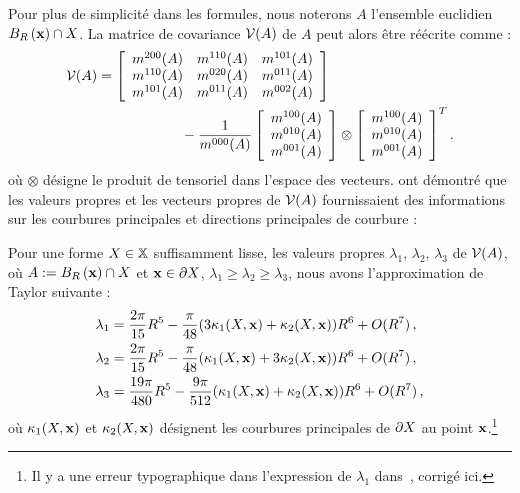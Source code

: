 Pour plus de simplicité dans les formules, nous noterons $A$ l'ensemble
euclidien $B_{R}\left(\mathbf{x}\right) \cap X$. La matrice de covariance $\mathcal{V}(A)$ de
$A$ peut alors être réécrite comme :
\begin{align}
  \mathcal{V}(A) &=  \left\lbrack
    \begin{array}{ccc}
      m^{200}(A) & m^{110}(A) & m^{101}(A)\\
      m^{110}(A) & m^{020}(A) & m^{011}(A)\\
      m^{101}(A) & m^{011}(A) & m^{002}(A)
    \end{array}
    \right\rbrack\quad\quad\quad\quad\quad\quad \nonumber \\
    &\quad\quad\quad\quad\quad\quad- \frac{1}{m^{000}(A)}
    \left\lbrack
    \begin{array}{c}
      m^{100}(A) \\
      m^{010}(A) \\
      m^{001}(A) \\
    \end{array}
    \right\rbrack
    \otimes
    \left\lbrack
    \begin{array}{c}
      m^{100}(A) \\
      m^{010}(A) \\
      m^{001}(A) \\
    \end{array}
    \right\rbrack^T.
\label{eq:defCov}
\end{align}
%
où $\otimes$ désigne le produit de tensoriel dans l'espace des vecteurs.
%
 ont démontré que les valeurs propres et les
vecteurs propres de $\mathcal{V}(A)$ fournissaient des informations sur les courbures
principales et directions principales de courbure :
%
\begin{lemma}
 \label{lem:pottmann-3d}
 Pour une forme $X \in \mathbb{X}$ suffisamment lisse, les valeurs propres $\lambda_1$,
 $\lambda_2$, $\lambda_3$ de $\mathcal{V}(A)$, où $ A := B_{R}\left(\mathbf{x}\right) \cap
 X$ et $\mathbf{x} \in \partial X$, $\lambda_1 \ge \lambda_2 \ge
 \lambda_3$, nous avons l'approximation de Taylor suivante :
 \begin{align}
   \lambda_1& = \frac{2\pi}{15}R^5 - \frac{\pi}{48}(3\kappa_{1}(X,\mathbf{x}) + \kappa_{2}(X,\mathbf{x}))R^6 + O(R^7)\,,\\
   \lambda_2& = \frac{2\pi}{15}R^5 - \frac{\pi}{48}(\kappa_{1}(X,\mathbf{x}) + 3\kappa_{2}(X,\mathbf{x}))R^6 + O(R^7)\,,\\
   \lambda_3& = \frac{19\pi}{480}R^5 - \frac{9\pi}{512}(\kappa_{1}(X,\mathbf{x}) + \kappa_{2}(X,\mathbf{x}))R^6 + O(R^7)\,,
 \end{align}
 où $\kappa_{1}(X,\mathbf{x})$ et $\kappa_{2}(X,\mathbf{x})$ désignent les
 courbures principales de  $\partial X$ au point $\mathbf{x}$.\footnote{Il y a une
 erreur typographique dans l'expression de $\lambda_1$ dans~\cite{Pottmann2007}, corrigé ici.}
\end{lemma}

